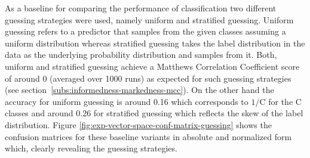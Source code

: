 As a baseline for comparing the performance of classification two different guessing strategies were used, namely uniform and stratified guessing. Uniform guessing refers to a predictor that samples from the given classes assuming a uniform distribution whereas stratified guessing takes the label distribution in the data as the underlying probability distribution and samples from it. Both, uniform and stratified guessing achieve a Matthews Correlation Coefficient score of around 0 (averaged over 1000 runs) as expected for such guessing strategies (see section~\ref{subs:informedness-markedness-mcc}). On the other hand the accuracy for uniform guessing is around 0.16 which corresponds to $1/\text{C}$ for the C classes and around 0.26 for stratified guessing which reflects the skew of the label distribution. Figure \ref{fig:exp-vector-space-conf-matrix-guessing} shows the confusion matrices for these baseline variants in absolute and normalized form which, clearly revealing the guessing strategies.

